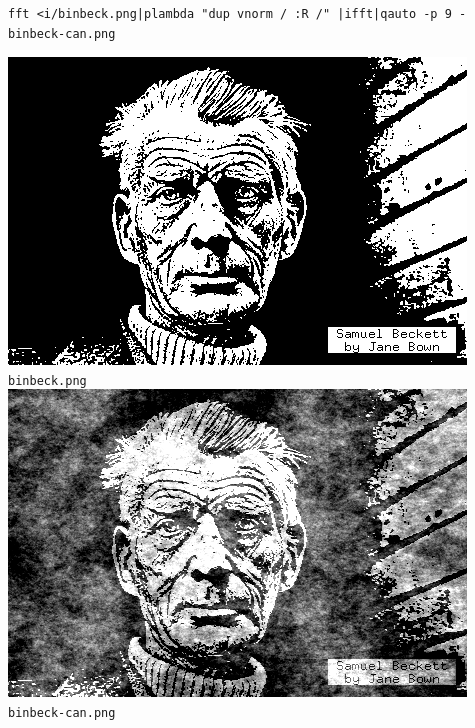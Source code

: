 \begin{verbatim}
fft <i/binbeck.png|plambda "dup vnorm / :R /" |ifft|qauto -p 9 - binbeck-can.png
\end{verbatim}
\includegraphics{i/binbeck.png}\verb+binbeck.png+\newline
\includegraphics{binbeck-can.png}\verb+binbeck-can.png+



